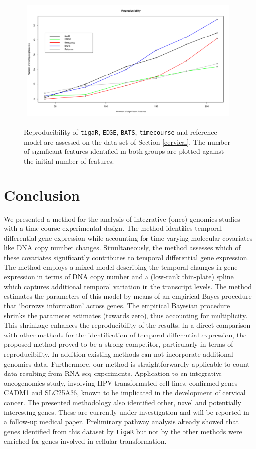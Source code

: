 \begin{figure}[h!]
\centering
\begin{tabular}{c}
\includegraphics[scale=0.4]{Figure10.pdf}
\end{tabular}
\caption{Reproducibility of {\tt tigaR}, {\tt EDGE}, {\tt BATS}, {\tt timecourse} and reference
 model are assessed on the data set of Section \ref{cervical}. The number of significant
 features identified in both groups are plotted against the initial number of
 features.}
\label{fig:reproduc}
\end{figure}

\section{Conclusion}
We presented a method for the analysis of integrative (onco) genomics studies with a time-course experimental design. The method identifies temporal differential gene expression while accounting for time-varying molecular covariates like DNA copy number changes. Simultaneously, the method assesses which of these covariates significantly contributes to temporal differential gene expression. The method employs a mixed model describing the temporal changes in gene expression in terms of DNA copy number and a (low-rank thin-plate) spline which captures additional temporal variation in the transcript levels. The method estimates the parameters of this model by means of an empirical Bayes procedure that `borrows information' across genes. The empirical Bayesian procedure shrinks the parameter estimates (towards zero), thus accounting for multiplicity. This shrinkage enhances the reproducibility of the results. In a direct comparison with other methods for the identification of temporal differential expression, the proposed method proved to be a strong competitor, particularly in terms of reproducibility. In addition existing methods can not incorporate additional genomics data. Furthermore, our method is straightforwardly applicable to count data resulting from RNA-seq experiments. Application to an integrative oncogenomics study, involving HPV-transformated cell lines, confirmed genes CADM1 and SLC25A36, known to be implicated in the development of cervical cancer. The presented methodology also identified other, novel and potentially interesting genes. These are currently under investigation and will be reported in a follow-up medical paper.
Preliminary pathway analysis already showed that genes identified from this dataset by {\tt tigaR} but not by the other methods were enriched for genes involved in cellular transformation.


